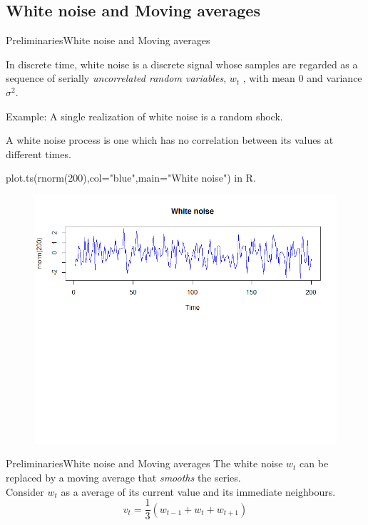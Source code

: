 \documentclass{beamer}
\begin{document}
\subsection{White noise and Moving averages}
\begin{frame}{Preliminaries}{White noise and Moving averages}
\begin{itemize}
	\small{
\item In discrete time, white noise is a discrete signal whose samples are regarded as a sequence of serially \textit{uncorrelated random variables}, $ w_t $ , with mean $ 0 $ and variance $ \sigma^2 $. \\

\item Example: A single realization of white noise is a random shock. \\

\item A white noise process is one which has no correlation between its values at different times. \\ }
\end{itemize}

\pause	
\small {plot.ts(rnorm(200),col="blue",main="White noise") in R. }

\begin{figure}
\centering
\includegraphics[width=0.8\linewidth]{whitenoise}
\caption{}
\end{figure}

\end{frame}

\begin{frame}{Preliminaries}{White noise and Moving averages}
The white noise $ w_t $ can be replaced by a moving average that \textit{smooths} the series. \\
Consider $ w_t $ as a average of its current value and its immediate neighbours. \\
\begin{equation}
v_t = \frac{1}{3} (w_{t-1}+w_t + w_{t+1})
\end{equation}



\end{frame}
\end{document}
